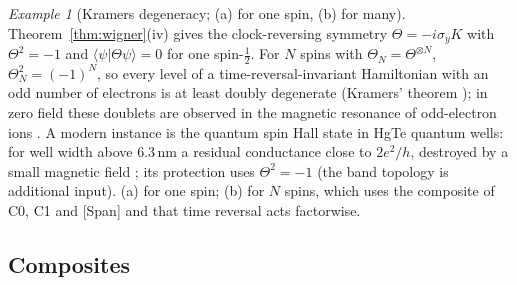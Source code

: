 \documentclass[aps,pra,onecolumn,superscriptaddress,nofootinbib,10pt]{revtex4-2}
\theoremstyle{definition}
\theoremstyle{remark}
\newtheorem{example}[theorem]{Example}
\begin{document}
\begin{example}[Kramers degeneracy; (a) for one spin, (b) for many]\label{ex:kramers}
Theorem~\ref{thm:wigner}(iv) gives the clock-reversing symmetry $\Theta=-i\sigma_yK$ with $\Theta^2=-1$ and
$\langle\psi|\Theta\psi\rangle=0$ for one spin-$\tfrac12$.  For $N$ spins with $\Theta_N=\Theta^{\otimes N}$, $\Theta_N^2=(-1)^N$, so every
level of a time-reversal-invariant Hamiltonian with an odd number of electrons is at least doubly
degenerate (Kramers' theorem \cite{ex-Kramers30}); in zero field these doublets are observed in the magnetic
resonance of odd-electron ions \cite{ex-AB70}.  A modern instance is the quantum spin Hall state in HgTe
quantum wells: for well width above $6.3$\,nm a residual conductance close to $2e^2/h$, destroyed by a
small magnetic field \cite{ex-Koenig07}; its protection uses $\Theta^2=-1$ (the band topology is additional
input).  (a) for one spin; (b) for $N$ spins, which uses the composite of C0, C1 and [Span]
and that time reversal acts factorwise.
\end{example}

\subsection{Composites}
\end{document}
